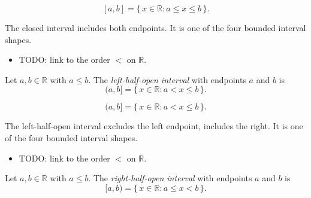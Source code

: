 \begin{remark*}
\[
[a,b]=\{\,x\in\mathbb{R} : a\le x\le b\,\}.
\]
\end{remark*}
\begin{remark*}[Interpretation]
The closed interval includes both endpoints. It is one of the four bounded interval shapes.
\end{remark*}
\begin{dependencies}
\begin{itemize}
  \item TODO: link to the order $<$ on $\mathbb{R}$.
\end{itemize}
\end{dependencies}
\begin{tcolorbox}[colback=defbox, colframe=defborder, arc=2pt,
  left=6pt, right=6pt, top=4pt, bottom=4pt,
  title={\small\textbf{Definition (Left-Half-Open Interval)}},
  fonttitle=\small\bfseries]
\begin{definition}
\label{def:left-half-open-interval}
Let $a,b\in\mathbb{R}$ with $a\le b$. The \emph{left-half-open interval} with endpoints $a$ and $b$ is
\[
(a,b]=\{\,x\in\mathbb{R} : a<x\le b\,\}.
\]
\end{definition}
\end{tcolorbox}
\begin{remark*}
\[
(a,b]=\{\,x\in\mathbb{R} : a<x\le b\,\}.
\]
\end{remark*}
\begin{remark*}[Interpretation]
The left-half-open interval excludes the left endpoint, includes the right. It is one of the four bounded interval shapes.
\end{remark*}
\begin{dependencies}
\begin{itemize}
  \item TODO: link to the order $<$ on $\mathbb{R}$.
\end{itemize}
\end{dependencies}
\begin{tcolorbox}[colback=defbox, colframe=defborder, arc=2pt,
  left=6pt, right=6pt, top=4pt, bottom=4pt,
  title={\small\textbf{Definition (Right-Half-Open Interval)}},
  fonttitle=\small\bfseries]
\begin{definition}
\label{def:right-half-open-interval}
Let $a,b\in\mathbb{R}$ with $a\le b$. The \emph{right-half-open interval} with endpoints $a$ and $b$ is
\[
[a,b)=\{\,x\in\mathbb{R} : a\le x<b\,\}.
\]
\end{definition}
\end{tcolorbox}
